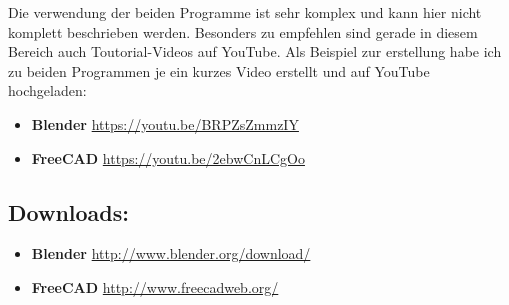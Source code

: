 \documentclass[11pt,a4paper]{scrartcl}
\begin{document}
Die verwendung der beiden Programme ist sehr komplex und kann hier nicht komplett beschrieben werden. Besonders zu empfehlen sind gerade in diesem Bereich auch Toutorial-Videos auf YouTube. Als Beispiel zur erstellung habe ich zu beiden Programmen je ein kurzes Video erstellt und auf YouTube hochgeladen:
\begin{itemize}
  \item \textbf{Blender} \url{https://youtu.be/BRPZsZmmzIY}
  \item \textbf{FreeCAD} \url{https://youtu.be/2ebwCnLCgOo}
\end{itemize}

\subsection*{Downloads:}
\begin{itemize}
  \item \textbf{Blender} \url{http://www.blender.org/download/}
  \item \textbf{FreeCAD} \url{http://www.freecadweb.org/}
\end{itemize}
\pagebreak
\end{document}
